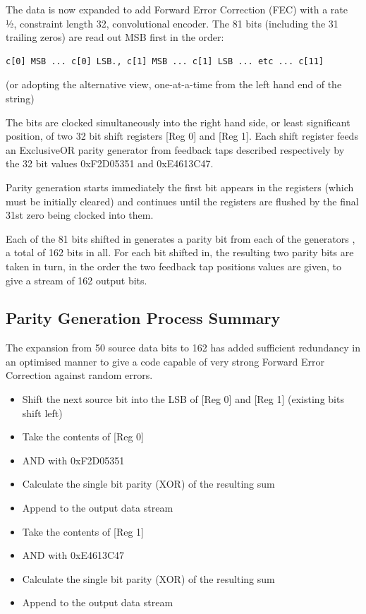 The data is now expanded to add Forward Error Correction (FEC) with a
rate ½, constraint length 32, convolutional encoder. The 81 bits
(including the 31 trailing zeros) are read out MSB first in the order:

\begin{lstlisting}
c[0] MSB ... c[0] LSB., c[1] MSB ... c[1] LSB ... etc ... c[11]
\end{lstlisting}

(or adopting the alternative view, one-at-a-time from the left hand end
of the string)

The bits are clocked simultaneously into the right hand side, or least
significant position, of two 32 bit shift registers {[}Reg 0{]} and
{[}Reg 1{]}. Each shift register feeds an ExclusiveOR parity generator
from feedback taps described respectively by the 32 bit values
0xF2D05351 and 0xE4613C47.

Parity generation starts immediately the first bit appears in the
registers (which must be initially cleared) and continues until the
registers are flushed by the final 31st zero being clocked into them.

Each of the 81 bits shifted in generates a parity bit from each of the
generators , a total of 162 bits in all. For each bit shifted in, the
resulting two parity bits are taken in turn, in the order the two
feedback tap positions values are given, to give a stream of 162 output
bits.

\hypertarget{parity-generation-process-summary}{%
\subsection{Parity Generation Process
Summary}\label{parity-generation-process-summary}}

The expansion from 50 source data bits to 162 has added sufficient
redundancy in an optimised manner to give a code capable of very strong
Forward Error Correction against random errors.

\begin{itemize}
\tightlist
\item
  Shift the next source bit into the LSB of {[}Reg 0{]} and {[}Reg 1{]}
  (existing bits shift left)
\item
  Take the contents of {[}Reg 0{]}
\item
  AND with 0xF2D05351
\item
  Calculate the single bit parity (XOR) of the resulting sum
\item
  Append to the output data stream
\item
  Take the contents of {[}Reg 1{]}
\item
  AND with 0xE4613C47
\item
  Calculate the single bit parity (XOR) of the resulting sum
\item
  Append to the output data stream
\end{itemize}

